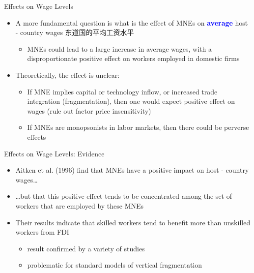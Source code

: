 \documentclass[10pt,hyperref={CJKbookmarks=true},xcolor=dvipsnames,aspectratio=169]{beamer}
\begin{document}
\begin{frame}{Effects on Wage Levels }

\begin{itemize}
\item A more fundamental question is what is the effect of MNEs on \textbf{\textcolor{blue}{average}}
host - country wages 东道国的平均工资水平

\begin{itemize}
\item MNEs could lead to a large increase in average wages, with a disproportionate
positive effect on workers employed in domestic firms 
\end{itemize}
\item Theoretically, the effect is unclear: 

\begin{itemize}
\item If MNE implies capital or technology inflow, or increased trade integration
(fragmentation), then one would expect positive effect on wages (rule
out factor price insensitivity)
\item If MNEs are monopsonists in labor markets, then there could be perverse
effects 
\end{itemize}
\end{itemize}
\end{frame}

\begin{frame}{Effects on Wage Levels: Evidence}

\begin{itemize}
\item Aitken et al. (1996) find that MNEs have a positive impact on host
- country wages… 
\item …but that this positive effect tends to be concentrated among the
set of workers that are employed by these MNEs 
\item Their results indicate that skilled workers tend to benefit more than
unskilled workers from FDI 

\begin{itemize}
\item result confirmed by a variety of studies 
\item problematic for standard models of vertical fragmentation
\end{itemize}
\end{itemize}
\end{frame}
\end{document}
